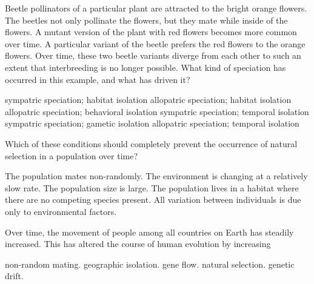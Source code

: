 \question
Beetle pollinators of a particular plant are attracted to the bright orange flowers. The beetles not only pollinate the flowers, but they mate while inside of the flowers. A mutant version of the plant with red flowers becomes more common over time. A particular variant of the beetle prefers the red flowers to the orange flowers. Over time, these two beetle variants diverge from each other to such an extent that interbreeding is no longer possible. What kind of speciation has occurred in this example, and what has driven it?

\begin{choices}
\correctchoice sympatric speciation; habitat isolation
\choice allopatric speciation; habitat isolation
\choice allopatric speciation; behavioral isolation
\choice sympatric speciation; temporal isolation
\choice sympatric speciation; gametic isolation
\choice allopatric speciation; temporal isolation
\end{choices}

\question
Which of these conditions should completely prevent the occurrence of natural selection in a population over time?

\begin{choices}
\choice The population mates non-randomly.
\choice The environment is changing at a relatively slow rate. 
\choice The population size is large. 
\choice The population lives in a habitat where there are no competing species present. 
\correctchoice All variation between individuals is due only to environmental factors. 
\end{choices}

\question
Over time, the movement of people among all countries on Earth has steadily increased. This has altered the course of human evolution by increasing

\begin{choices}
\choice non-random mating. 
\choice geographic isolation. 
\correctchoice gene flow. 
\choice natural selection. 
\choice genetic drift. 
\end{choices}
